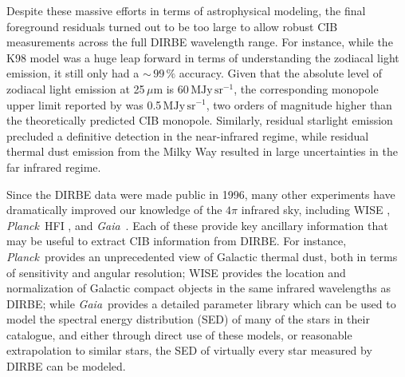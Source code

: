 \documentclass{aa}
\def\Planck{\textit{Planck}}
\def\Gaia{\textit{Gaia}}
\begin{document}
Despite these massive efforts in terms of astrophysical modeling, the final foreground residuals turned out to be too large to allow robust CIB measurements across the full DIRBE wavelength range. For instance, while the K98 model was a huge leap forward in terms of understanding the zodiacal light emission, it still only had a $\sim$\,$99\,\%$ accuracy. Given that the absolute level of zodiacal light emission at 25$\,\mu\mathrm{m}$ is 60\,$\mathrm{MJy\,sr^{-1}}$, the corresponding monopole upper limit reported by \citet{hauser1998} was 0.5\,$\mathrm{MJy\,sr^{-1}}$, two orders of magnitude higher than the theoretically predicted CIB monopole. Similarly, residual starlight emission precluded a definitive detection in the near-infrared regime, while residual thermal dust emission from the Milky Way resulted in large uncertainties in the far infrared regime. 

Since the DIRBE data were made public in 1996, many other experiments have dramatically improved our knowledge of the $4\pi$ infrared sky, including WISE \citep{wright:2010}, \Planck\ HFI \citep{planck2016-l03}, and \Gaia\ \citep{gaia:2016}. Each of these provide key ancillary information that may be useful to extract CIB information from  DIRBE. For instance, \Planck\ provides an unprecedented view of Galactic thermal dust, both in terms of sensitivity and angular resolution; WISE provides the location and normalization of Galactic compact objects in the same infrared wavelengths as DIRBE; while \Gaia\ provides a detailed parameter library which can be used to model the spectral energy distribution (SED) of many of the stars in their catalogue, and either through direct use of these models, or reasonable extrapolation to similar stars, the SED of virtually every star measured by DIRBE can be modeled.
\end{document}
